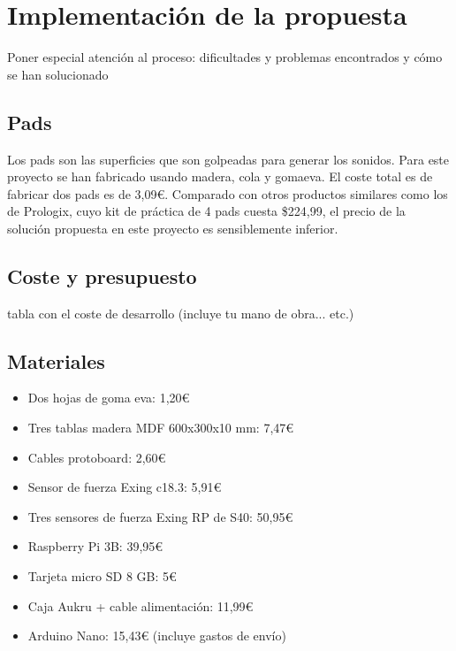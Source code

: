 
\chapter{Implementación de la propuesta}
\label{cha:Implementacion}

    Poner especial atención al proceso: dificultades y problemas encontrados y cómo se han solucionado

        \section{Pads} %
        \label{sec:Pads}

            Los pads son las superficies que son golpeadas para generar los sonidos. Para este proyecto se han fabricado
            usando madera, cola y gomaeva\cite{GomaEva}. El coste total es de fabricar dos pads es de 3,09\euro{}.
            Comparado con otros productos similares como los de Prologix\cite{practice_pad}, cuyo kit de práctica de 4
            pads cuesta \$224,99, el precio de la solución propuesta en este proyecto es sensiblemente inferior.


        \section{Coste y presupuesto} %
        \label{sec:CosteYPresupuesto}

            tabla con el coste de desarrollo (incluye tu mano de obra... etc.)


        \section{Materiales} %
        \label{sec:Materiales}

            \begin{itemize}
                \item Dos hojas de goma eva: 1,20\euro{}
                \item Tres tablas madera MDF 600x300x10 mm: 7,47\euro{}
                \item Cables protoboard: 2,60\euro{}
                \item Sensor de fuerza Exing c18.3: 5,91\euro{}
                \item Tres sensores de fuerza Exing RP de S40: 50,95\euro{}
                \item Raspberry Pi 3B: 39,95\euro{}
                \item Tarjeta micro SD 8 GB: 5\euro{}
                \item Caja Aukru + cable alimentación: 11,99\euro{}
                \item Arduino Nano: 15,43\euro{} (incluye gastos de envío)
            \end{itemize}

